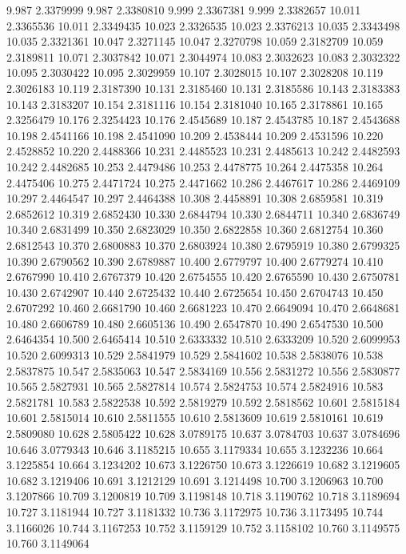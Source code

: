 9.987 2.3379999
9.987 2.3380810
9.999 2.3367381
9.999 2.3382657
10.011 2.3365536
10.011 2.3349435
10.023 2.3326535
10.023 2.3376213
10.035 2.3343498
10.035 2.3321361
10.047 2.3271145
10.047 2.3270798
10.059 2.3182709
10.059 2.3189811
10.071 2.3037842
10.071 2.3044974
10.083 2.3032623
10.083 2.3032322
10.095 2.3030422
10.095 2.3029959
10.107 2.3028015
10.107 2.3028208
10.119 2.3026183
10.119 2.3187390
10.131 2.3185460
10.131 2.3185586
10.143 2.3183383
10.143 2.3183207
10.154 2.3181116
10.154 2.3181040
10.165 2.3178861
10.165 2.3256479
10.176 2.3254423
10.176 2.4545689
10.187 2.4543785
10.187 2.4543688
10.198 2.4541166
10.198 2.4541090
10.209 2.4538444
10.209 2.4531596
10.220 2.4528852
10.220 2.4488366
10.231 2.4485523
10.231 2.4485613
10.242 2.4482593
10.242 2.4482685
10.253 2.4479486
10.253 2.4478775
10.264 2.4475358
10.264 2.4475406
10.275 2.4471724
10.275 2.4471662
10.286 2.4467617
10.286 2.4469109
10.297 2.4464547
10.297 2.4464388
10.308 2.4458891
10.308 2.6859581
10.319 2.6852612
10.319 2.6852430
10.330 2.6844794
10.330 2.6844711
10.340 2.6836749
10.340 2.6831499
10.350 2.6823029
10.350 2.6822858
10.360 2.6812754
10.360 2.6812543
10.370 2.6800883
10.370 2.6803924
10.380 2.6795919
10.380 2.6799325
10.390 2.6790562
10.390 2.6789887
10.400 2.6779797
10.400 2.6779274
10.410 2.6767990
10.410 2.6767379
10.420 2.6754555
10.420 2.6765590
10.430 2.6750781
10.430 2.6742907
10.440 2.6725432
10.440 2.6725654
10.450 2.6704743
10.450 2.6707292
10.460 2.6681790
10.460 2.6681223
10.470 2.6649094
10.470 2.6648681
10.480 2.6606789
10.480 2.6605136
10.490 2.6547870
10.490 2.6547530
10.500 2.6464354
10.500 2.6465414
10.510 2.6333332
10.510 2.6333209
10.520 2.6099953
10.520 2.6099313
10.529 2.5841979
10.529 2.5841602
10.538 2.5838076
10.538 2.5837875
10.547 2.5835063
10.547 2.5834169
10.556 2.5831272
10.556 2.5830877
10.565 2.5827931
10.565 2.5827814
10.574 2.5824753
10.574 2.5824916
10.583 2.5821781
10.583 2.5822538
10.592 2.5819279
10.592 2.5818562
10.601 2.5815184
10.601 2.5815014
10.610 2.5811555
10.610 2.5813609
10.619 2.5810161
10.619 2.5809080
10.628 2.5805422
10.628 3.0789175
10.637 3.0784703
10.637 3.0784696
10.646 3.0779343
10.646 3.1185215
10.655 3.1179334
10.655 3.1232236
10.664 3.1225854
10.664 3.1234202
10.673 3.1226750
10.673 3.1226619
10.682 3.1219605
10.682 3.1219406
10.691 3.1212129
10.691 3.1214498
10.700 3.1206963
10.700 3.1207866
10.709 3.1200819
10.709 3.1198148
10.718 3.1190762
10.718 3.1189694
10.727 3.1181944
10.727 3.1181332
10.736 3.1172975
10.736 3.1173495
10.744 3.1166026
10.744 3.1167253
10.752 3.1159129
10.752 3.1158102
10.760 3.1149575
10.760 3.1149064

